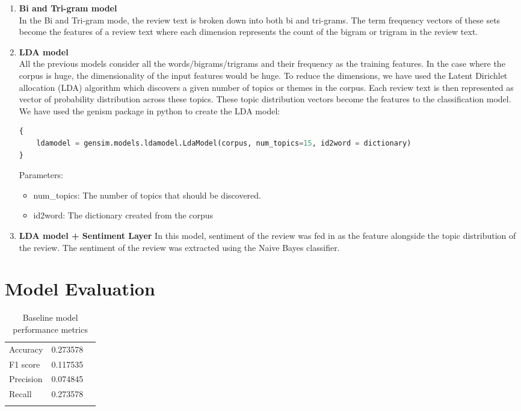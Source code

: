 \documentclass[paper=a4, fontsize=11pt]{scrartcl} %
\numberwithin{equation}{section} %
\numberwithin{figure}{section} %
\numberwithin{table}{section} %
\begin{document}
\begin{enumerate}
\item \textbf{Bi and Tri-gram model}\\
In the Bi and Tri-gram mode, the review text is broken down into both bi and tri-grams. The term frequency vectors of these sets become the features of a review text where each dimension represents the count of the bigram or trigram in the review text.

\item \textbf{LDA model}\\
All the previous models consider all the words/bigrams/trigrams and their frequency as the training features. In the case where the corpus is huge, the dimensionality of the input features would be huge. To reduce the dimensions, we have used the Latent Dirichlet allocation (LDA) algorithm which discovers a given number of topics or themes in the corpus. Each review text is then represented as vector of probability distribution across these topics. These topic distribution vectors become the features to the classification model.
We have used the genism package in python to create the LDA model:
\begin{lstlisting}[language=python]
{
	ldamodel = gensim.models.ldamodel.LdaModel(corpus, num_topics=15, id2word = dictionary)
}
\end{lstlisting}

Parameters:
\begin{itemize}
\item num\_topics:  The number of topics that should be discovered.
\item id2word: The dictionary created from the corpus
\end{itemize}

\item \textbf{LDA model + Sentiment Layer}
In this model, sentiment of the review was fed in as the feature alongside the topic distribution of the review. The sentiment of the review was extracted using the Naive Bayes classifier. 
\end{enumerate}

\section{Model Evaluation}
\begin{table}[!htb]
 \centering
 \caption{Baseline model performance metrics}
 \label{baseline_performance}
 \begin{tabular}{l l l} 
    \noalign{\smallskip}\hline\noalign{\smallskip}
    Accuracy & 0.273578\\
    F1 score & 0.117535\\
    Precision & 0.074845\\
    Recall &0.273578\\
    \noalign{\smallskip}\hline
  \end{tabular} 
\end{table}  
\end{document}
